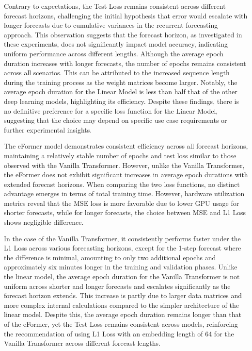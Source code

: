 \documentclass{article}
\begin{document}
Contrary to expectations, the Test Loss remains consistent across different forecast horizons, challenging the initial hypothesis that error would escalate with longer forecasts due to cumulative variances in the recurrent forecasting approach. This observation suggests that the forecast horizon, as investigated in these experiments, does not significantly impact model accuracy, indicating uniform performance across different lengths. Although the average epoch duration increases with longer forecasts, the number of epochs remains consistent across all scenarios. This can be attributed to the increased sequence length during the training process as the weight matrices become larger. Notably, the average epoch duration for the Linear Model is less than half that of the other deep learning models, highlighting its efficiency. Despite these findings, there is no definitive preference for a specific loss function for the Linear Model, suggesting that the choice may depend on specific use case requirements or further experimental insights.



The eFormer model demonstrates consistent efficiency across all forecast horizons, maintaining a relatively stable number of epochs and test loss similar to those observed with the Vanilla Transformer. However, unlike the Vanilla Transformer, the eFormer does not exhibit significant increases in average epoch durations with extended forecast horizons. When comparing the two loss functions, no distinct advantage emerges in terms of total training time. However, hardware utilization metrics reveal that the MSE loss is more favorable due to lower GPU usage for shorter forecasts, while for longer forecasts, the choice between MSE and L1 Loss shows negligible difference.

In the case of the Vanilla Transformer, it consistently performs faster under the L1 Loss across various forecasting horizons, except for the 1-step forecast where the difference is minimal, amounting to only two additional epochs and approximately six minutes longer in the training and validation phases. Unlike the linear model, the average epoch duration for the Vanilla Transformer is not uniform across shorter and longer forecasts and escalates significantly as the forecast horizon extends. This increase is partly due to larger data matrices and more complex internal calculations compared to the simpler architecture of the linear model. Despite this, the average epoch duration remains longer than that of the eFormer, yet the Test Loss remains consistent across models, reinforcing the recommendation of using L1 Loss with an embedding length of 64 for the Vanilla Transformer across different forecast lengths.
\end{document}
